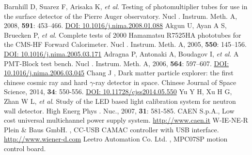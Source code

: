 \documentclass{nst}
\providecommand{\DIFadd}[1]{{\protect\color{yellow} \sf #1}} %
\providecommand{\DIFaddbegin}{} %
\providecommand{\DIFaddend}{} %
\providecommand{\DIFdelbegin}{} %
\providecommand{\DIFdelend}{} %
\begin{document}
\begin{thebibliography}{99}
	 Barnhill D, Suarez F, Arisaka K, \emph{et al}. Testing of photomultiplier tubes for use in the surface detector of the {Pierre} {Auger} observatory. Nucl\DIFdelbegin \DIFdelend \DIFaddbegin \DIFadd{. Instrum. Meth. }\DIFaddend A, 2008, {\bf 591}: 453--466.
	\href{http://dx.doi.org/10.1016/j.nima.2008.01.088}{DOI: 10.1016/j.nima.2008.01.088}
	 Akgun U, Ayan A S, Bruecken P, \emph{et al}. Complete tests of 2000 {Hamamatsu} {R}7525HA phototubes for the {CMS}-{HF} {Forward} {Calorimeter}. Nucl\DIFdelbegin \DIFdelend \DIFaddbegin \DIFadd{. Instrum. Meth. }\DIFaddend A, 2005, {\bf 550}: 145--156.
	\href{http://dx.doi.org/10.1016/j.nima.2005.03.171}{DOI: 10.1016/j.nima.2005.03.171}
	 Adragna P, Antonaki A, Boudagov I, \emph{et al}. A {PMT}-{Block} test bench. Nucl\DIFdelbegin \DIFdelend \DIFaddbegin \DIFadd{. Instrum. Meth. }\DIFaddend A, 2006, {\bf 564}: 597--607.
	\href{http://dx.doi.org/10.1016/j.nima.2006.03.045}{DOI: 10.1016/j.nima.2006.03.045}
	 Chang J\DIFdelbegin \DIFdelend \DIFaddbegin \DIFadd{, Dark matter particle explorer: the first chinese cosmic ray and hard }\DIFaddend $\gamma$-ray \DIFdelbegin \DIFdelend \DIFaddbegin \DIFadd{detector in space}\DIFaddend . Chinese Journal of Space Science, 2014, {\bf 34}: 550-556.
	\href{http://dx.doi.org/10.11728/cjss2014.05.550}{DOI: 10.11728/cjss2014.05.550}
	 Yu Y H, Xu H G, Zhan W L, \emph{et al}. Study of the LED based light calibration system for neutron wall detector. High Energ Phys\DIFdelbegin \DIFdelend \DIFaddbegin \DIFadd{. Nuc.}\DIFaddend , 2007, {\bf 31}: 581-585.
	 {CAEN S.p.A.}, Low \DIFdelbegin %
\DIFdelend \DIFaddbegin \DIFadd{cost universal multichannel power supply system. }\href{http://www.caen.it/csite/CaenProd.jsp?idmod=491&parent=20}{http://www.caen.it}
	\DIFaddend {} {W-IE-NE-R Plein \& Baus GmbH.}\DIFaddbegin \DIFadd{, }\DIFaddend {CC-USB CAMAC \DIFdelbegin \DIFdelend \DIFaddbegin \DIFadd{controller }\DIFaddend with USB interface}. \DIFdelbegin %
\DIFdelend \DIFaddbegin \href{http://www.wiener-d.com/sc/modules/camac--modules/cc-usb.html}{http://www.wiener-d.com}
	\DIFaddend {} {Leetro Automation Co. Ltd.}\DIFaddbegin \DIFadd{, }\DIFaddend {MPC07SP \DIFdelbegin \DIFdelend \DIFaddbegin \DIFadd{motion control board}\DIFaddend }. \DIFdelbegin %

\end{thebibliography}
\end{document}
